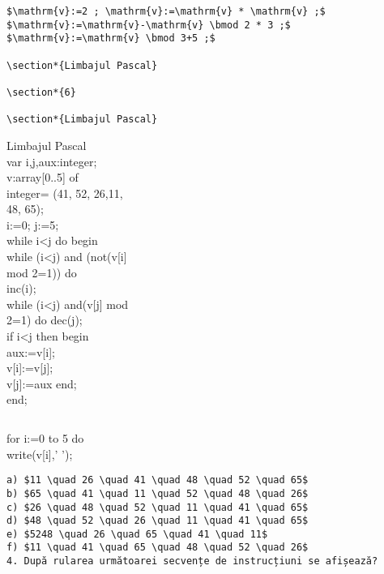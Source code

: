 \begin{verbatim}
$\mathrm{v}:=2 ; \mathrm{v}:=\mathrm{v} * \mathrm{v} ;$
$\mathrm{v}:=\mathrm{v}-\mathrm{v} \bmod 2 * 3 ;$
$\mathrm{v}:=\mathrm{v} \bmod 3+5 ;$

\section*{Limbajul Pascal}

\section*{6}

\section*{Limbajul Pascal}
\end{verbatim}

Limbajul Pascal\\
var i,j,aux:integer;\\[0pt]
v:array[0..5] of\\
integer= (41, 52, 26,11,\\
48, 65);\\
i:=0; j:=5;\\
while i<j do begin\\[0pt]
while (i<j) and (not(v[i]\\
mod 2=1)) do\\
inc(i);\\[0pt]
while (i<j) and(v[j] mod\\
2=1) do dec(j);\\
if i<j then begin\\[0pt]
aux:=v[i];\\[0pt]
v[i]:=v[j];\\[0pt]
v[j]:=aux end;\\
end;

\begin{verbatim}

\end{verbatim}

for i:=0 to 5 do\\[0pt]
write(v[i],' ');

\begin{verbatim}
a) $11 \quad 26 \quad 41 \quad 48 \quad 52 \quad 65$
b) $65 \quad 41 \quad 11 \quad 52 \quad 48 \quad 26$
c) $26 \quad 48 \quad 52 \quad 11 \quad 41 \quad 65$
d) $48 \quad 52 \quad 26 \quad 11 \quad 41 \quad 65$
e) $5248 \quad 26 \quad 65 \quad 41 \quad 11$
f) $11 \quad 41 \quad 65 \quad 48 \quad 52 \quad 26$
4. După rularea următoarei secvențe de instrucțiuni se afișează?
\end{verbatim}


